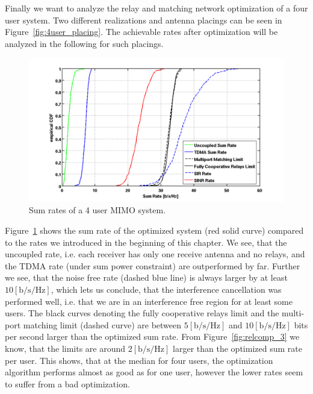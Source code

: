 Finally we want to analyze the relay and matching network optimization of a four user system.
Two different realizations and antenna placings can be seen in Figure~\ref{fig:4user_placing}.
The achievable rates after optimization will be analyzed in the following for such placings.
\begin{figure}[h]
\centering
  \includegraphics[width=\linewidth]{images/4user_sumrate.png}
\caption{Sum rates of a 4 user MIMO system.}
\label{fig:4user_sumrate}
\end{figure}

Figure~\ref{fig:4user_sumrate} shows the sum rate of the optimized system (red solid curve) compared to the rates we introduced in the beginning of this chapter.
We see, that the uncoupled rate, i.e. each receiver has only one receive antenna and no relays, and the TDMA rate (under sum power constraint) are outperformed by far.
Further we see, that the noise free rate (dashed blue line) is always larger by  at least  $10 \left[\text{b/s/Hz}\right]$, which lets us conclude, that the interference cancellation was performed well, i.e. that we are in an interference free region for at least some users.
The black curves denoting the fully cooperative relays limit and the multi-port matching limit (dashed curve) are between $5 \left[\text{b/s/Hz}\right]$ and $10 \left[\text{b/s/Hz}\right]$ bits per second larger than the optimized sum rate.
From Figure~\ref{fig:relcomp_3} we know, that the limits are around $2 \left[\text{b/s/Hz}\right]$ larger than the optimized sum rate per user.
This shows, that at the median for four users, the optimization algorithm performs almost as good as for one user, however the lower rates seem to suffer from a bad optimization.

